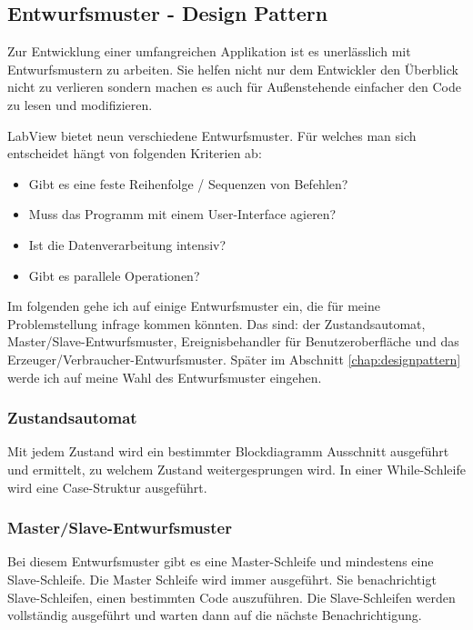 	\subsection{Entwurfsmuster - Design Pattern}
	\label{chap:entwurfsmuster}
Zur Entwicklung einer umfangreichen Applikation ist es unerlässlich mit Entwurfsmustern zu arbeiten. Sie helfen nicht nur dem Entwickler den Überblick nicht zu verlieren sondern machen es auch für Außenstehende einfacher den Code zu lesen und modifizieren.

LabView bietet neun verschiedene Entwurfsmuster. Für welches man sich entscheidet hängt von folgenden Kriterien ab:
\begin{itemize}
	\item Gibt es eine feste Reihenfolge / Sequenzen von Befehlen?
	\item Muss das Programm mit einem User-Interface agieren?
	\item Ist die Datenverarbeitung intensiv? 
	\item Gibt es parallele Operationen?
\end{itemize}

Im folgenden gehe ich auf einige Entwurfsmuster ein, die für meine Problemstellung infrage kommen könnten. Das sind: der Zustandsautomat, Master/Slave-Entwurfsmuster, Ereignisbehandler für Benutzeroberfläche und das Erzeuger/Verbraucher-Entwurfsmuster. Später im Abschnitt \ref{chap:designpattern} werde ich auf meine Wahl des Entwurfsmuster eingehen.

\subsubsection{Zustandsautomat}%
Mit jedem Zustand wird ein bestimmter Blockdiagramm Ausschnitt ausgeführt und ermittelt, zu welchem Zustand weitergesprungen wird. In einer While-Schleife wird eine Case-Struktur ausgeführt. 
	
\subsubsection{Master/Slave-Entwurfsmuster}
Bei diesem Entwurfsmuster gibt es eine Master-Schleife und mindestens eine Slave-Schleife. Die Master Schleife wird immer ausgeführt. Sie benachrichtigt Slave-Schleifen, einen bestimmten Code auszuführen. Die Slave-Schleifen werden vollständig ausgeführt und warten dann auf die nächste Benachrichtigung.

